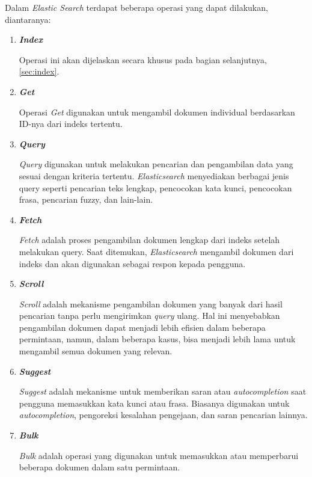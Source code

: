 Dalam \textit{Elastic Search} terdapat beberapa operasi yang dapat dilakukan, diantaranya:
\begin{enumerate}
    \item \textbf{\textit{Index}}
    
    Operasi ini akan dijelaskan secara khusus pada bagian selanjutnya, \ref{sec:index}.

    \item \textbf{\textit{Get}}
    
    Operasi \textit{Get} digunakan untuk mengambil dokumen individual berdasarkan ID-nya dari indeks tertentu.
    
    \item \textbf{\textit{Query}}
    
    \textit{Query} digunakan untuk melakukan pencarian dan pengambilan data yang sesuai dengan kriteria tertentu. \textit{Elasticsearch} menyediakan berbagai jenis query seperti pencarian teks lengkap, pencocokan kata kunci, pencocokan frasa, pencarian fuzzy, dan lain-lain.
    
    \item \textbf{\textit{Fetch}}
    
    \textit{Fetch} adalah proses pengambilan dokumen lengkap dari indeks setelah melakukan query. Saat ditemukan, \textit{Elasticsearch} mengambil dokumen dari indeks dan akan digunakan sebagai respon kepada pengguna.
    
    \item \textbf{\textit{Scroll}}
    
    \textit{Scroll} adalah mekanisme pengambilan dokumen yang banyak dari hasil pencarian tanpa perlu mengirimkan \textit{query} ulang. Hal ini menyebabkan pengambilan dokumen dapat menjadi lebih efisien dalam beberapa permintaan, namun, dalam beberapa kasus, bisa menjadi lebih lama untuk mengambil semua dokumen yang relevan.
    
    \item \textbf{\textit{Suggest}}
    
    \textit{Suggest} adalah mekanisme untuk memberikan saran atau \textit{autocompletion} saat pengguna memasukkan kata kunci atau frasa. Biasanya digunakan untuk \textit{autocompletion}, pengoreksi kesalahan pengejaan, dan saran pencarian lainnya.
    
    \item \textbf{\textit{Bulk}}
    
    \textit{Bulk} adalah operasi yang digunakan untuk memasukkan atau memperbarui beberapa dokumen dalam satu permintaan.
    

\end{enumerate}
